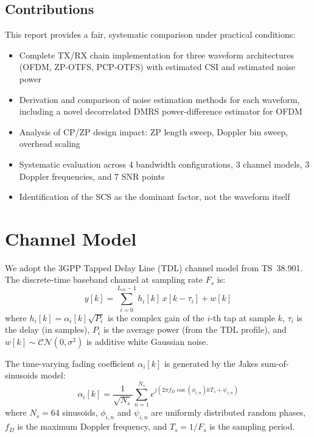 \documentclass[11pt,a4paper,twoside]{article}
\newcommand{\CN}{\mathcal{CN}}
\begin{document}
\subsection{Contributions}

This report provides a fair, systematic comparison under practical conditions:
\begin{itemize}[nosep]
    \item Complete TX/RX chain implementation for three waveform architectures (OFDM, ZP-OTFS, PCP-OTFS) with estimated CSI and estimated noise power
    \item Derivation and comparison of noise estimation methods for each waveform, including a novel decorrelated DMRS power-difference estimator for OFDM
    \item Analysis of CP/ZP design impact: ZP length sweep, Doppler bin sweep, overhead scaling
    \item Systematic evaluation across 4 bandwidth configurations, 3 channel models, 3 Doppler frequencies, and 7 SNR points
    \item Identification of the SCS as the dominant factor, not the waveform itself
\end{itemize}

\section{Channel Model}
\label{sec:channel}

We adopt the 3GPP Tapped Delay Line (TDL) channel model from TS~38.901. The discrete-time baseband channel at sampling rate $F_s$ is:
\begin{equation}
    y[k] = \sum_{i=0}^{L_{ch}-1} h_i[k] \, x[k - \tau_i] + w[k]
    \label{eq:channel}
\end{equation}
where $h_i[k] = \alpha_i[k]\sqrt{P_i}$ is the complex gain of the $i$-th tap at sample $k$, $\tau_i$ is the delay (in samples), $P_i$ is the average power (from the TDL profile), and $w[k] \sim \CN(0, \sigma^2)$ is additive white Gaussian noise.

The time-varying fading coefficient $\alpha_i[k]$ is generated by the Jakes sum-of-sinusoids model:
\begin{equation}
    \alpha_i[k] = \frac{1}{\sqrt{N_s}} \sum_{n=1}^{N_s} e^{j(2\pi f_D \cos(\phi_{i,n}) k T_s + \psi_{i,n})}
\end{equation}
where $N_s = 64$ sinusoids, $\phi_{i,n}$ and $\psi_{i,n}$ are uniformly distributed random phases, $f_D$ is the maximum Doppler frequency, and $T_s = 1/F_s$ is the sampling period.
\end{document}
